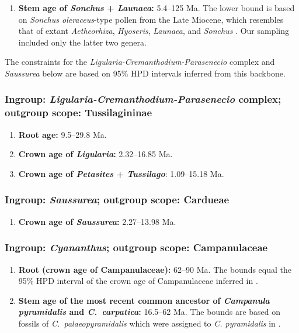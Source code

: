 \begin{enumerate}
\item \textbf{Stem age of \textit{Sonchus} + \textit{Launaea}:}
  5.4--125 Ma. The lower bound is based on \textit{Sonchus
    oleraceus}-type pollen from the Late Miocene, which resembles that
  of extant \textit{Aetheorhiza}, \textit{Hyoseris}, \textit{Launaea},
  and \textit{Sonchus} \citep{Blackmore1986}. Our sampling included
  only the latter two genera.

\end{enumerate}

\noindent The constraints for the
\textit{Ligularia-Cremanthodium-Parasenecio} complex and
\textit{Saussurea} below are based on 95\% HPD intervals inferred from
this backbone.

\subsubsection*{Ingroup: \textit{Ligularia-Cremanthodium-Parasenecio}
  complex; outgroup scope: Tussilagininae}

\begin{enumerate}

\item \textbf{Root age:} 9.5--29.8 Ma.

\item \textbf{Crown age of \textit{Ligularia}:} 2.32--16.85 Ma.

\item \textbf{Crown age of \textit{Petasites} + \textit{Tussilago}}:
  1.09--15.18 Ma.

\end{enumerate}

\subsubsection*{Ingroup: \textit{Saussurea}; outgroup scope:
  Cardueae}

\begin{enumerate}
\item \textbf{Crown age of \textit{Saussurea}:} 2.27--13.98 Ma. %
\end{enumerate}

\subsubsection*{Ingroup: \textit{Cyananthus}; outgroup scope:
  Campanulaceae}

\begin{enumerate}

\item \textbf{Root (crown age of Campanulaceae):} 62--90 Ma. The
  bounds equal the 95\% HPD interval of the crown age of Campanulaceae
  inferred in \cite{Magallon2015}.

\item \textbf{Stem age of the most recent common ancestor of
    \textit{Campanula pyramidalis} and \textit{C.~carpatica}:}
  16.5--62 Ma. The bounds are based on fossils of
  \textit{C.~palaeopyramidalis} \citep{Lancucka-Srodoniowa1979} which
  were assigned to \textit{C. pyramidalis} in \cite{Cellinese2009}.
\end{enumerate}

